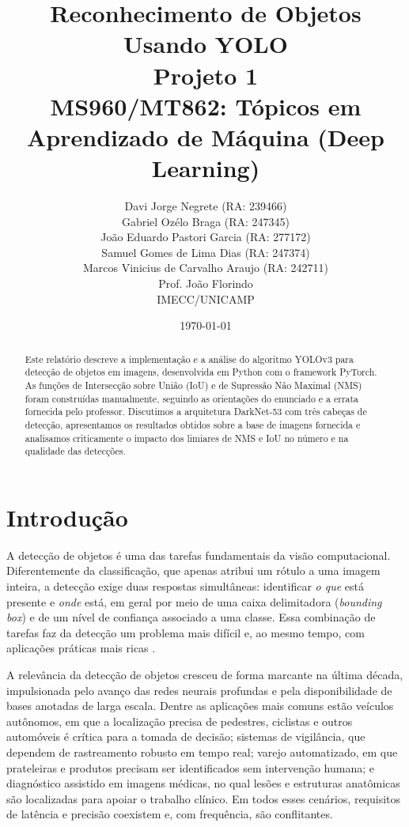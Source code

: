 \documentclass[11pt,a4paper]{article}
\title{\textbf{Reconhecimento de Objetos Usando YOLO} \\
       \large Projeto 1 \\
       \large MS960/MT862: Tópicos em Aprendizado de Máquina (Deep Learning)}
\author{
  Davi Jorge Negrete (RA: 239466) \\
  Gabriel Ozélo Braga (RA: 247345) \\
  João Eduardo Pastori Garcia (RA: 277172) \\
  Samuel Gomes de Lima Dias (RA: 247374) \\
  Marcos Vinicius de Carvalho Araujo (RA: 242711) \\[0.5em]
  \small Prof. João Florindo \\
  \small IMECC/UNICAMP
}
\date{\today}
\begin{document}
\maketitle

\begin{abstract}
\noindent Este relatório descreve a implementação e a análise do algoritmo YOLOv3 para detecção de objetos em imagens, desenvolvida em Python com o framework PyTorch. As funções de Intersecção sobre União (IoU) e de Supressão Não Maximal (NMS) foram construídas manualmente, seguindo as orientações do enunciado e a errata fornecida pelo professor. Discutimos a arquitetura DarkNet-53 com três cabeças de detecção, apresentamos os resultados obtidos sobre a base de imagens fornecida e analisamos criticamente o impacto dos limiares de NMS e IoU no número e na qualidade das detecções.
\end{abstract}

\section{Introdução}

A detecção de objetos é uma das tarefas fundamentais da visão computacional. Diferentemente da classificação, que apenas atribui um rótulo a uma imagem inteira, a detecção exige duas respostas simultâneas: identificar \emph{o que} está presente e \emph{onde} está, em geral por meio de uma caixa delimitadora (\textit{bounding box}) e de um nível de confiança associado a uma classe. Essa combinação de tarefas faz da detecção um problema mais difícil e, ao mesmo tempo, com aplicações práticas mais ricas \cite{lin2014coco,zou2023survey}.

A relevância da detecção de objetos cresceu de forma marcante na última década, impulsionada pelo avanço das redes neurais profundas e pela disponibilidade de bases anotadas de larga escala. Dentre as aplicações mais comuns estão veículos autônomos, em que a localização precisa de pedestres, ciclistas e outros automóveis é crítica para a tomada de decisão; sistemas de vigilância, que dependem de rastreamento robusto em tempo real; varejo automatizado, em que prateleiras e produtos precisam ser identificados sem intervenção humana; e diagnóstico assistido em imagens médicas, no qual lesões e estruturas anatômicas são localizadas para apoiar o trabalho clínico. Em todos esses cenários, requisitos de latência e precisão coexistem e, com frequência, são conflitantes.
\end{document}
